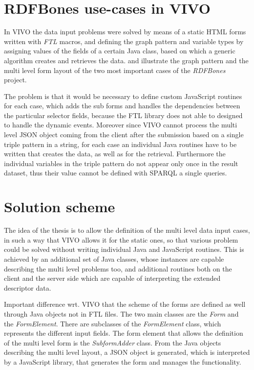 \section{RDFBones use-cases in VIVO}

In VIVO the data input problems were solved by means of a static HTML forms written with \textit{FTL} macros, and defining the graph pattern and variable types by assigning values of the fields of a certain Java class, based on which a generic algorithm creates and retrieves the data.  and  illustrate the graph pattern and the multi level form layout of the two most important cases of the \textit{RDFBones} project. 



The problem is that it would be necessary to define custom JavaScript routines for each case, which adds the sub forms and handles the dependencies between the particular selector fields, because the FTL library does not able to designed to handle the dynamic events. Moreover since VIVO cannot process the multi level JSON object coming from the client after the submission based on a single triple pattern in a string, for each case an individual Java routines have to be written that creates the data, as well as for the retrieval. Furthermore the individual variables in the triple pattern do not appear only once in the result dataset, thus their value cannot be defined with SPARQL a single queries. 

\section{Solution scheme}

The idea of the thesis is to allow the definition of the multi level data input cases, in such a way that VIVO allows it for the static ones, so that various problem could be solved without writing individual Java and JavaScript routines. This is achieved by an additional set of Java classes, whose instances are capable describing the multi level problems too, and additional routines both on the client and the server side which are capable of interpreting the extended descriptor data.

Important difference wrt. VIVO that the scheme of the forms are defined as well through Java objects not in FTL files. The two main classes are the \textit{Form} and the \textit{FormElement}. There are subclasses of the \textit{FormElement} class, which represents the different input fields. The form element that allows the definition of the multi level form is the \textit{SubformAdder} class. From the Java objects describing the multi level layout, a JSON object is generated, which is interpreted by a JavaScript library, that generates the form and manages the functionality.

